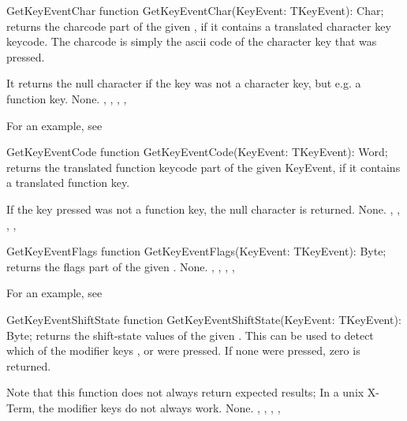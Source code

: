 
\begin{function}{GetKeyEventChar}
\Declaration
function GetKeyEventChar(KeyEvent: TKeyEvent): Char;
\Description
{} returns the charcode part of the given 
, if it contains a translated character key 
keycode. The charcode is simply the ascii code of the 
character key that was pressed.

It returns the null character if the key was not a character key, but e.g. a
function key.
\Errors
None.
\SeeAlso
{},
, 
,
,
\end{function}

For an example, see 

\begin{function}{GetKeyEventCode}
\Declaration
function GetKeyEventCode(KeyEvent: TKeyEvent): Word;
\Description
{} returns the translated function keycode part of 
the given KeyEvent, if it contains a translated function key.

If the key pressed was not a function key, the null character is returned.
\Errors
None.
\SeeAlso
{},
, 
,
,
\end{function}


\begin{function}{GetKeyEventFlags}
\Declaration
function GetKeyEventFlags(KeyEvent: TKeyEvent): Byte;
\Description
{} returns the flags part of the given 
. 
\Errors
None.
\SeeAlso
{},
, 
,
,
\end{function}

For an example, see 

\begin{function}{GetKeyEventShiftState}
\Declaration
function GetKeyEventShiftState(KeyEvent: TKeyEvent): Byte;
\Description
{} returns the shift-state values of 
the given . This can be used to detect which of the modifier
keys ,  or  were pressed. If none were
pressed, zero is returned.

Note that this function does not always return expected results;
In a unix X-Term, the modifier keys do not always work.
\Errors
None.
\SeeAlso
{},
, 
,
,
\end{function}

